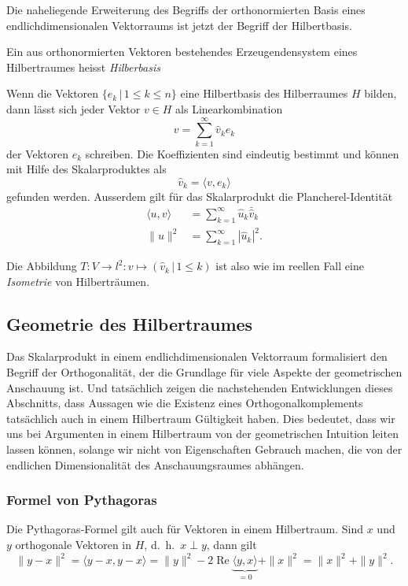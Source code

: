 Die naheliegende Erweiterung des Begriffs der orthonormierten Basis
eines endlichdimensionalen Vektorraums ist jetzt der Begriff der
Hilbertbasis.

\begin{definition}
Ein aus orthonormierten Vektoren bestehendes Erzeugendensystem
eines Hilbertraumes heisst {\em Hilberbasis}
\end{definition}
%

\begin{satz}
Wenn die Vektoren $\{e_k\,|\, 1\le k\le n\}$ eine Hilbertbasis des
Hilberraumes $H$ bilden,
dann lässt sich jeder Vektor $v\in H$ als Linearkombination
\[
v
=
\sum_{k=1}^\infty \hat{v}_k e_k
\]
der Vektoren $e_k$ schreiben.
Die Koeffizienten sind eindeutig bestimmt und können mit Hilfe des
Skalarproduktes als
\[
\hat{v}_k = \langle v,e_k\rangle
\]
gefunden werden.
Ausserdem gilt für das Skalarprodukt die Plancherel-Identität
%
\begin{align*}
\langle u,v\rangle &= \sum_{k=1}^\infty \hat{u}_k\bar{\hat{v}}_k
\\
\| u \|^2 &= \sum_{k=1}^\infty |\hat{u}_k|^2.
\end{align*}
\end{satz}

Die Abbildung $T\colon V\to l^2: v\mapsto (\hat{v}_k\,|\,1\le k)$
ist also wie im reellen Fall eine {\em Isometrie} von Hilberträumen.
%

\subsection{Geometrie des Hilbertraumes
\label{subsection:geometrie-hilbertraum}}
Das Skalarprodukt in einem endlichdimensionalen Vektorraum formalisiert
den Begriff der Orthogonalität, der die Grundlage für viele Aspekte
der geometrischen Anschauung ist.
Und tatsächlich zeigen die nachstehenden Entwicklungen dieses Abschnitts,
dass Aussagen wie die Existenz eines Orthogonalkomplements tatsächlich
auch in einem Hilbertraum Gültigkeit haben.
Dies bedeutet, dass wir uns bei Argumenten in einem Hilbertraum von 
der geometrischen Intuition leiten lassen können, solange wir nicht
von Eigenschaften Gebrauch machen, die von der endlichen Dimensionalität
des Anschauungsraumes abhängen.

\subsubsection{Formel von Pythagoras}
%
Die Pythagoras-Formel gilt auch für Vektoren in einem Hilbertraum.
Sind $x$ und $y$ orthogonale Vektoren in $H$, d.~h.~$x\perp y$, dann
gilt
\begin{equation}
\|y-x\|^2
=
\langle y-x,y-x\rangle
=
\|y\|^2
-
2\operatorname{Re}\underbrace{\langle y,x\rangle}_{\displaystyle=0}
+
\|x\|^2
=
\|x\|^2 + \|y\|^2.
\label{formel:pythagoras}
\end{equation}

